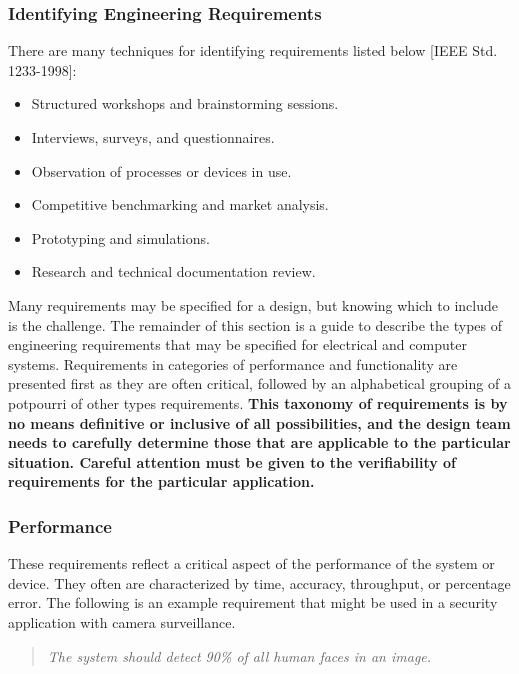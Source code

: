 \subsubsection{Identifying Engineering
Requirements}\label{identifying-engineering-requirements}

There are many techniques for identifying requirements listed below
{[}IEEE Std. 1233-1998{]}:

\begin{itemize}
\item
  Structured workshops and brainstorming sessions.
\item
  Interviews, surveys, and questionnaires.
\item
  Observation of processes or devices in use.
\item
  Competitive benchmarking and market analysis.
\item
  Prototyping and simulations.
\item
  Research and technical documentation review.
\end{itemize}

Many requirements may be specified for a design, but knowing which to
include is the challenge. The remainder of this section is a guide to
describe the types of engineering requirements that may be specified for
electrical and computer systems. Requirements in categories of
performance and functionality are presented first as they are often
critical, followed by an alphabetical grouping of a potpourri of other
types requirements. \textbf{This taxonomy of requirements is by no means
definitive or inclusive of all possibilities, and the design team needs
to carefully determine those that are applicable to the particular
situation. Careful attention must be given to the verifiability of
requirements for the particular application.}

\subsubsection*{Performance}\label{performance}

These requirements reflect a critical aspect of the performance of the
system or device. They often are characterized by time, accuracy,
throughput, or percentage error. The following is an example requirement
that might be used in a security application with camera surveillance.

\begin{quote}
\emph{The system should detect 90\% of all human faces in an image.}
\end{quote}

